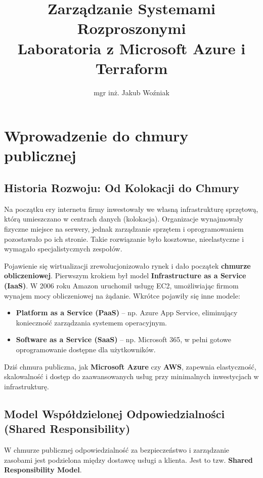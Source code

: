\documentclass{article}
\title{Zarządzanie Systemami Rozproszonymi\\Laboratoria z Microsoft Azure i Terraform}
\author{mgr inż. Jakub Woźniak}
\date{}
\begin{document}
\maketitle
\section{Wprowadzenie do chmury publicznej}

\subsection{Historia Rozwoju: Od Kolokacji do Chmury}
Na początku ery internetu firmy inwestowały we własną infrastrukturę sprzętową, którą umieszczano w centrach danych (kolokacja). Organizacje wynajmowały fizyczne miejsce na serwery, jednak zarządzanie sprzętem i oprogramowaniem pozostawało po ich stronie. Takie rozwiązanie było kosztowne, nieelastyczne i wymagało specjalistycznych zespołów.

Pojawienie się wirtualizacji zrewolucjonizowało rynek i dało początek \textbf{chmurze obliczeniowej}. Pierwszym krokiem był model \textbf{Infrastructure as a Service (IaaS)}. W 2006 roku Amazon uruchomił usługę EC2, umożliwiając firmom wynajem mocy obliczeniowej na żądanie. Wkrótce pojawiły się inne modele:
\begin{itemize}
    \item \textbf{Platform as a Service (PaaS)} – np. Azure App Service, eliminujący konieczność zarządzania systemem operacyjnym.
    \item \textbf{Software as a Service (SaaS)} – np. Microsoft 365, w pełni gotowe oprogramowanie dostępne dla użytkowników.
\end{itemize}

Dziś chmura publiczna, jak \textbf{Microsoft Azure} czy \textbf{AWS}, zapewnia elastyczność, skalowalność i dostęp do zaawansowanych usług przy minimalnych inwestycjach w infrastrukturę.

\subsection{Model Współdzielonej Odpowiedzialności (Shared Responsibility)}
W chmurze publicznej odpowiedzialność za bezpieczeństwo i zarządzanie zasobami jest podzielona między dostawcę usługi a klienta. Jest to tzw. \textbf{Shared Responsibility Model}.
\end{document}
